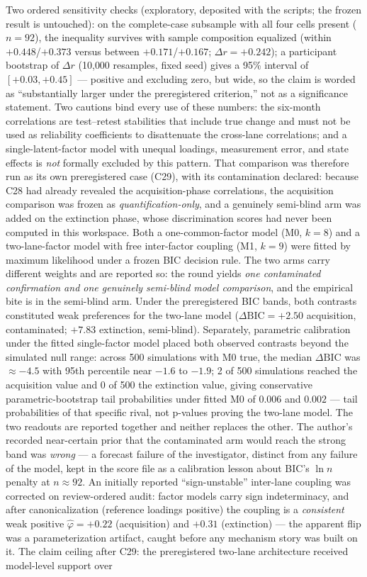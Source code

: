 \documentclass[9pt,twocolumn]{article}
\begin{document}
Two ordered sensitivity checks (exploratory, deposited with the scripts; the frozen result is untouched): on the complete-case subsample with all four cells present ($n{=}92$), the inequality survives with sample composition equalized (within $+0.448$/$+0.373$ versus between $+0.171$/$+0.167$; $\Delta r = +0.242$); a participant bootstrap of $\Delta r$ (10{,}000 resamples, fixed seed) gives a 95\% interval of $[+0.03, +0.45]$ --- positive and excluding zero, but wide, so the claim is worded as ``substantially larger under the preregistered criterion,'' not as a significance statement. Two cautions bind every use of these numbers: the six-month correlations are test--retest stabilities that include true change and must not be used as reliability coefficients to disattenuate the cross-lane correlations; and a single-latent-factor model with unequal loadings, measurement error, and state effects is \emph{not} formally excluded by this pattern. That comparison was therefore run as its own preregistered case (C29), with its contamination declared: because C28 had already revealed the acquisition-phase correlations, the acquisition comparison was frozen as \emph{quantification-only}, and a genuinely semi-blind arm was added on the extinction phase, whose discrimination scores had never been computed in this workspace. Both a one-common-factor model (M0, $k{=}8$) and a two-lane-factor model with free inter-factor coupling (M1, $k{=}9$) were fitted by maximum likelihood under a frozen BIC decision rule. The two arms carry different weights and are reported so: the round yields \emph{one contaminated confirmation and one genuinely semi-blind model comparison}, and the empirical bite is in the semi-blind arm. Under the preregistered BIC bands, both contrasts constituted weak preferences for the two-lane model ($\Delta\mathrm{BIC}=+2.50$ acquisition, contaminated; $+7.83$ extinction, semi-blind). Separately, parametric calibration under the fitted single-factor model placed both observed contrasts beyond the simulated null range: across 500 simulations with M0 true, the median $\Delta\mathrm{BIC}$ was $\approx-4.5$ with 95th percentile near $-1.6$ to $-1.9$; 2 of 500 simulations reached the acquisition value and 0 of 500 the extinction value, giving conservative parametric-bootstrap tail probabilities under fitted M0 of $0.006$ and $0.002$ --- tail probabilities of that specific rival, not p-values proving the two-lane model. The two readouts are reported together and neither replaces the other. The author's recorded near-certain prior that the contaminated arm would reach the strong band was \emph{wrong} --- a forecast failure of the investigator, distinct from any failure of the model, kept in the score file as a calibration lesson about BIC's $\ln n$ penalty at $n{\approx}92$. An initially reported ``sign-unstable'' inter-lane coupling was corrected on review-ordered audit: factor models carry sign indeterminacy, and after canonicalization (reference loadings positive) the coupling is a \emph{consistent} weak positive $\hat\varphi=+0.22$ (acquisition) and $+0.31$ (extinction) --- the apparent flip was a parameterization artifact, caught before any mechanism story was built on it. The claim ceiling after C29: the preregistered two-lane architecture received model-level support over 
\end{document}
